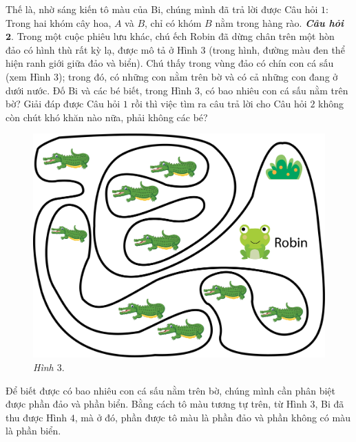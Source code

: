 \begin{multicols}{2}
	\vskip 0.1cm
	Thế là, nhờ sáng kiến tô màu của Bi, chúng  mình đã trả lời được Câu hỏi $1$: Trong hai khóm cây hoa, $A$ và $B$, chỉ có khóm $B$ nằm trong hàng rào.
	\vskip 0.1cm
	\textbf{\color{toancuabi}\textit{Câu hỏi $\pmb{2.}$}} Trong một cuộc phiêu lưu khác, chú ếch Robin đã dừng chân trên một hòn đảo có hình thù rất kỳ lạ, được mô tả ở Hình $3$ (trong hình, đường màu đen thể hiện ranh giới giữa đảo và biển). Chú thấy trong vùng đảo có chín con cá sấu (xem Hình $3$); trong đó, có những con nằm trên bờ và có cả những con đang ở dưới nước. Đố Bi và các bé biết, trong Hình $3$, có bao nhiêu con cá sấu nằm trên bờ?
	\vskip 0.1cm
	Giải đáp được Câu hỏi $1$ rồi thì việc tìm ra câu trả lời cho Câu hỏi $2$ không còn chút khó khăn nào nữa, phải không các bé?
	\begin{figure}[H]
		\centering
		\vspace*{-5pt}
		\captionsetup{labelformat= empty, justification=centering}
		\includegraphics[width=1\linewidth]{pic12}
		\caption{\small\textit{Hình $3.$}}
		\vspace*{-10pt}
	\end{figure}
	Để biết được có bao nhiêu con cá sấu nằm trên bờ, chúng mình cần phân biệt được phần đảo và phần biển. Bằng cách tô màu tương tự trên, từ Hình $3$, Bi đã thu được Hình $4$, mà ở đó, phần được tô màu là phần đảo và phần không có màu là phần biển.
	\begin{figure}[H]
		\centering
		\vspace*{-5pt}
		\captionsetup{labelformat= empty, justification=centering}

\end{figure}
\end{multicols}
